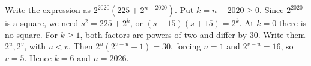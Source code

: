 Write the expression as $2^{2020}(225+2^{n-2020})$. Put $k=n-2020\ge0$. Since $2^{2020}$ is a square, we need $s^2=225+2^k$, or $(s-15)(s+15)=2^k$. At $k=0$ there is no square. For $k\ge1$, both factors are powers of two and differ by $30$. Write them $2^u,2^v$, with $u<v$. Then $2^u(2^{v-u}-1)=30$, forcing $u=1$ and $2^{v-u}=16$, so $v=5$. Hence $k=6$ and $\boxed{n=2026}$.
